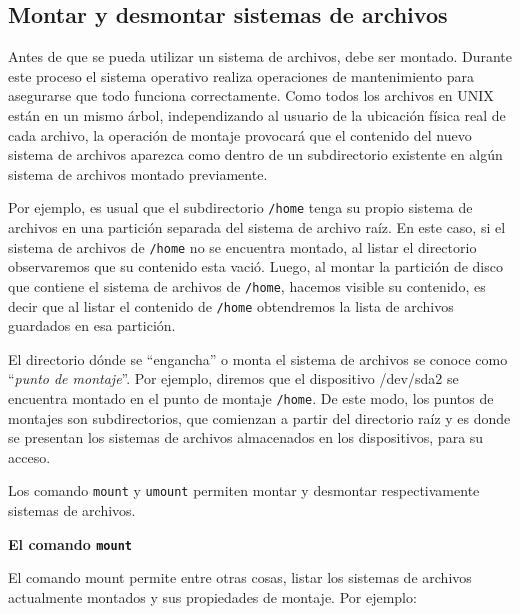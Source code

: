 \documentclass[12pt]{article}
\begin{document}
\subsection*{Montar y desmontar sistemas de archivos}

Antes de que se pueda utilizar un sistema de archivos, debe ser montado. 
Durante este proceso el sistema operativo realiza operaciones de 
mantenimiento para asegurarse que todo funciona correctamente. 
Como todos los archivos en UNIX están en un mismo árbol, independizando 
al usuario de la ubicación física real de cada archivo, la operación de 
montaje provocará que el contenido del nuevo sistema de archivos 
aparezca como dentro de un subdirectorio existente en algún 
sistema de archivos montado previamente.

Por ejemplo, es usual que el subdirectorio \texttt{/home} tenga su propio 
sistema de archivos en una partición separada del sistema de archivo raíz.
En este caso, si el sistema de archivos de \texttt{/home} no se encuentra
montado, al listar el directorio observaremos que su contenido 
esta vació. Luego, al montar la partición de disco que contiene el sistema
de archivos de \texttt{/home}, hacemos visible su contenido, es decir que 
al listar el contenido de \texttt{/home} obtendremos la lista de archivos
guardados en esa partición. 

El directorio dónde se ``engancha'' o monta el sistema de archivos se 
conoce como ``\textit{punto de montaje}''. Por ejemplo, diremos que el 
dispositivo {/dev/sda2} se encuentra montado en el punto de montaje 
\texttt{/home}. De este modo, los puntos de montajes son subdirectorios, 
que comienzan a partir del directorio raíz y es donde se presentan los
sistemas de archivos almacenados en los dispositivos, para su acceso.  

Los comando \texttt{mount} y \texttt{umount} permiten montar y desmontar
respectivamente sistemas de archivos. 

\textbf{El comando \texttt{mount}}

El comando mount permite entre otras cosas, listar los sistemas de 
archivos actualmente montados y sus propiedades de montaje. Por ejemplo: 
\end{document}
